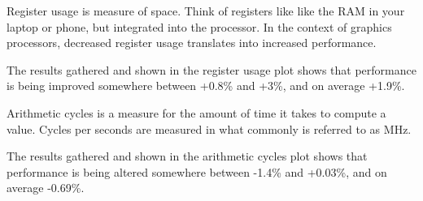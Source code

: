 \documentclass[12pt,a4paper,onecolumn,openright]{report}
\begin{document}
\begin{multicols}{2}
Register usage is measure of space. Think of registers like like the RAM in your laptop or phone, but integrated into the processor. In the context of graphics processors, decreased register usage translates into increased performance.


The results gathered and shown in the register usage plot shows that performance is being improved somewhere between +0.8\% and +3\%, and on average +1.9\%.



\begin{figure}[H]
\label{plot:a_cycles}
\end{figure}

Arithmetic cycles is a measure for the amount of time it takes to compute a value. Cycles per seconds are measured in what commonly is referred to as MHz.

The results gathered and shown in the arithmetic cycles plot shows that performance is being altered somewhere between -1.4\% and +0.03\%, and on average -0.69\%.



\end{multicols}
\end{document}
